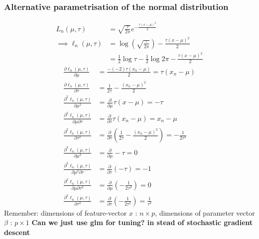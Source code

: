\subsubsection{Alternative parametrisation of the normal distribution}
\begin{equation}\begin{split}
    L_n(\mu, \tau) &= \sqrt{\frac{\tau}{2\pi}}e^{-\frac{\tau\left(x - \mu\right)^2}{2}} \\
    \implies \ell_n(\mu, \tau) &= \log\left(\sqrt{\frac{\tau}{2\pi}}\right) - \frac{\tau\left(x - \mu\right)^2}{2}\\
    & = \frac{1}{2}\log \tau - \frac{1}{2} \log 2\pi - \frac{\tau\left(x - \mu\right)^2}{2}
\end{split}
\end{equation}
\begin{equation}
\begin{split}
    \frac{\partial \ell_n\left(\mu, \tau\right)}{\partial \mu} &= \frac{- 
    \left(-2\right)\tau\left(x_n - \mu\right)}{2} = \tau\left(x_n - \mu\right) \\
    \frac{\partial \ell_n\left(\mu, \tau\right)}{\partial \tau} &= \frac{1}{2\tau} - \frac{\left(x_n - \mu\right)^2}{2}\\
    \frac{\partial^2 \ell_n\left(\mu, \tau\right)}{\partial\mu^2} &= \frac{\partial}{\partial\mu} \tau\left(x - \mu\right) = -\tau \\
    \frac{\partial^2\ell_n\left(\mu,\tau\right)}{\partial\mu\partial\tau} &= \frac{\partial}{\partial \tau} \tau\left(x_n - \mu\right) = x_n - \mu \\
    \frac{\partial^2\ell_n\left(\mu, \tau\right)}{\partial \tau^2} &= \frac{\partial}{\partial\tau} \left(\frac{1}{2\tau} - \frac{\left(x_n - \mu\right)^2}{2}\right) = -\frac{1}{2\tau^2}\\
    \frac{\partial ^3 \ell_n\left(\mu, \tau\right)}{\partial \mu^3} &= \frac{\partial}{\partial \mu} -\tau = 0\\
    \frac{\partial^3 \ell_n\left(\mu, \tau\right)}{\partial \mu^2\partial\tau} &=\frac{\partial}{\partial \tau} \left(-\tau\right) = -1 \\
    \frac{\partial^3\ell_n\left(\mu, \tau\right)}{\partial\mu\partial\tau^2} &= \frac{\partial}{\partial\mu}\left(-\frac{1}{2\tau^2}\right) = 0 \\
    \frac{\partial^3\ell_n\left(\mu, \tau\right)}{\partial \tau^3} &= \frac{\partial}{\partial \tau} \left(-\frac{1}{2\tau^2}\right) = \frac{1}{\tau^3}
\end{split}
\end{equation}
Remember: dimensions of feature-vector $x$ : $n\times p $, dimensions of parameter vector $\beta$ : $p \times 1$ 
\textbf{Can we just use glm for tuning? in stead of stochastic gradient descent}


